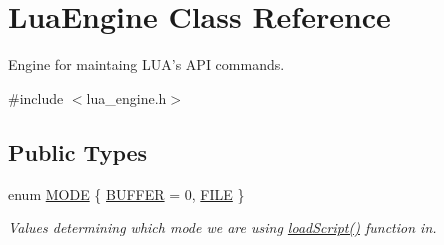 \hypertarget{class_lua_engine}{\section{Lua\-Engine Class Reference}
\label{class_lua_engine}
}


Engine for maintaing L\-U\-A's A\-P\-I commands.  




{\ttfamily \#include $<$lua\-\_\-engine.\-h$>$}

\subsection*{Public Types}
\begin{DoxyCompactItemize}
\item 
enum \hyperlink{class_lua_engine_a70152f6f27278ec4262bd4712823a72d}{M\-O\-D\-E} \{ \hyperlink{class_lua_engine_a70152f6f27278ec4262bd4712823a72da483618369ed68950688dd6fa572664b9}{B\-U\-F\-F\-E\-R} =  0, 
\hyperlink{class_lua_engine_a70152f6f27278ec4262bd4712823a72daac87617557f4c3f7c559f1aed56a1645}{F\-I\-L\-E}
 \}
\begin{DoxyCompactList}\small\item\em Values determining which mode we are using \hyperlink{class_lua_engine_aab9337ae5ea59bccc1e08c4015d42700}{load\-Script()} function in. \end{DoxyCompactList}\end{DoxyCompactItemize}
